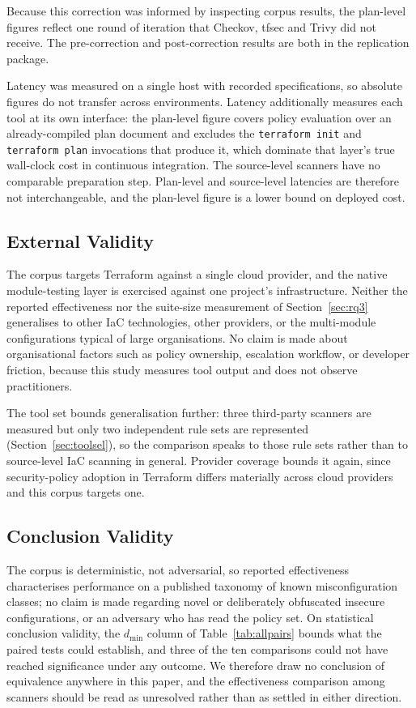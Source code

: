 \documentclass[smallextended]{svjour3}
\begin{document}
Because this correction was informed by inspecting corpus results, the plan-level
figures reflect one round of iteration that Checkov, tfsec and Trivy did not
receive. The pre-correction and post-correction results are both in the
replication package.

Latency was measured on a single host with recorded specifications, so absolute
figures do not transfer across environments. Latency additionally measures each
tool at its own interface: the plan-level figure covers policy evaluation over an
already-compiled plan document and excludes the \texttt{terraform init} and
\texttt{terraform plan} invocations that produce it, which dominate that layer's
true wall-clock cost in continuous integration. The source-level scanners have no
comparable preparation step. Plan-level and source-level latencies are therefore
not interchangeable, and the plan-level figure is a lower bound on deployed cost.

\subsection{External Validity}
The corpus targets Terraform against a single cloud provider, and the native
module-testing layer is exercised against one project's infrastructure. Neither
the reported effectiveness nor the suite-size measurement of
Section~\ref{sec:rq3} generalises to other IaC technologies, other providers, or
the multi-module configurations typical of large organisations. No claim is made
about organisational factors such as policy ownership, escalation workflow, or
developer friction, because this study measures tool output and does not observe
practitioners.

The tool set bounds generalisation further: three third-party scanners are
measured but only two independent rule sets are represented
(Section~\ref{sec:toolsel}), so the comparison speaks to those rule sets rather
than to source-level IaC scanning in general. Provider coverage bounds it again,
since security-policy adoption in Terraform differs materially across cloud
providers \citep{verdet2025adoption} and this corpus targets one.

\subsection{Conclusion Validity}
The corpus is deterministic, not adversarial, so reported effectiveness
characterises performance on a published taxonomy of known misconfiguration
classes; no claim is made regarding novel or deliberately obfuscated insecure
configurations, or an adversary who has read the policy set. On statistical
conclusion validity, the $d_{\min}$ column of Table~\ref{tab:allpairs} bounds
what the paired tests could establish, and three of the ten comparisons could not
have reached significance under any outcome. We therefore draw no conclusion of
equivalence anywhere in this paper, and the effectiveness comparison among
scanners should be read as unresolved rather than as settled in either direction.
\end{document}
